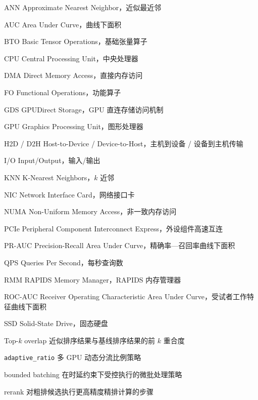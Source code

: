 
\begin{denotation}[4.8cm]
  \item[ANN] Approximate Nearest Neighbor，近似最近邻
  \item[AUC] Area Under Curve，曲线下面积
  \item[BTO] Basic Tensor Operations，基础张量算子
  \item[CPU] Central Processing Unit，中央处理器
  \item[DMA] Direct Memory Access，直接内存访问
  \item[FO] Functional Operations，功能算子
  \item[GDS] GPUDirect Storage，GPU 直连存储访问机制
  \item[GPU] Graphics Processing Unit，图形处理器
  \item[H2D / D2H] Host-to-Device / Device-to-Host，主机到设备 / 设备到主机传输
  \item[I/O] Input/Output，输入/输出
  \item[KNN] K-Nearest Neighbors，$k$ 近邻
  \item[NIC] Network Interface Card，网络接口卡
  \item[NUMA] Non-Uniform Memory Access，非一致内存访问
  \item[PCIe] Peripheral Component Interconnect Express，外设组件高速互连
  \item[PR-AUC] Precision-Recall Area Under Curve，精确率—召回率曲线下面积
  \item[QPS] Queries Per Second，每秒查询数
  \item[RMM] RAPIDS Memory Manager，RAPIDS 内存管理器
  \item[ROC-AUC] Receiver Operating Characteristic Area Under Curve，受试者工作特征曲线下面积
  \item[SSD] Solid-State Drive，固态硬盘
  \item[Top-$k$ overlap] 近似排序结果与基线排序结果的前 $k$ 重合度
  \item[\texttt{adaptive\_ratio}] 多 GPU 动态分流比例策略
  \item[bounded batching] 在时延约束下受控执行的微批处理策略
  \item[rerank] 对粗排候选执行更高精度精排计算的步骤
\end{denotation}
